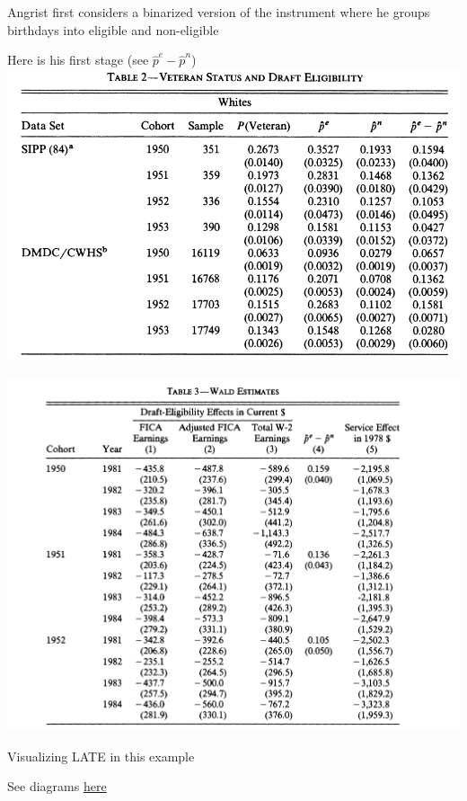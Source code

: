 \documentclass[11pt,english,handout]{beamer}
\newenvironment{wideitemize}{\itemize\addtolength{\itemsep}{10pt}}{\enditemize}
\begin{document}
\begin{frame}
	\begin{wideitemize}
		\item
		Angrist first considers a binarized version of the instrument where he groups birthdays into eligible and non-eligible
		
		\item
		Here is his first stage (see $\hat{p}^e - \hat{p}^n$)
	\end{wideitemize}
\includegraphics[width = 0.7 \linewidth]{angrist-first-stage}
\end{frame}


\begin{frame}
	\includegraphics[width = 0.9 \linewidth]{angrist-wald}
\end{frame}


\begin{frame}{Visualizing LATE in this example}
	
	See diagrams \href{https://www.dropbox.com/s/nddh9vb6pjxvlng/2sls\%20diagrams.pdf?dl=0}{\underline{here}}
\end{frame}
\end{document}
